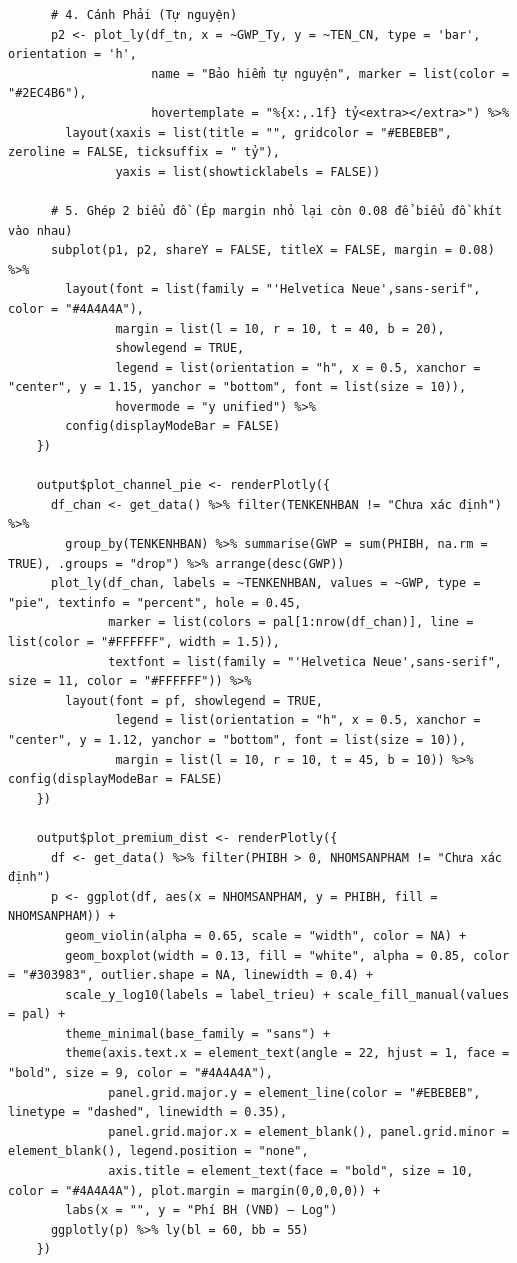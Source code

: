 \documentclass[12pt, a4paper]{article}
\begin{document}
\begin{lstlisting}
      # 4. Cánh Phải (Tự nguyện)
      p2 <- plot_ly(df_tn, x = ~GWP_Ty, y = ~TEN_CN, type = 'bar', orientation = 'h',
                    name = "Bảo hiểm tự nguyện", marker = list(color = "#2EC4B6"),
                    hovertemplate = "%{x:,.1f} tỷ<extra></extra>") %>%
        layout(xaxis = list(title = "", gridcolor = "#EBEBEB", zeroline = FALSE, ticksuffix = " tỷ"),
               yaxis = list(showticklabels = FALSE)) 
      
      # 5. Ghép 2 biểu đồ (Ép margin nhỏ lại còn 0.08 để biểu đồ khít vào nhau)
      subplot(p1, p2, shareY = FALSE, titleX = FALSE, margin = 0.08) %>%
        layout(font = list(family = "'Helvetica Neue',sans-serif", color = "#4A4A4A"),
               margin = list(l = 10, r = 10, t = 40, b = 20),
               showlegend = TRUE,
               legend = list(orientation = "h", x = 0.5, xanchor = "center", y = 1.15, yanchor = "bottom", font = list(size = 10)),
               hovermode = "y unified") %>% 
        config(displayModeBar = FALSE)
    })

    output$plot_channel_pie <- renderPlotly({
      df_chan <- get_data() %>% filter(TENKENHBAN != "Chưa xác định") %>%
        group_by(TENKENHBAN) %>% summarise(GWP = sum(PHIBH, na.rm = TRUE), .groups = "drop") %>% arrange(desc(GWP))
      plot_ly(df_chan, labels = ~TENKENHBAN, values = ~GWP, type = "pie", textinfo = "percent", hole = 0.45,
              marker = list(colors = pal[1:nrow(df_chan)], line = list(color = "#FFFFFF", width = 1.5)),
              textfont = list(family = "'Helvetica Neue',sans-serif", size = 11, color = "#FFFFFF")) %>%
        layout(font = pf, showlegend = TRUE,
               legend = list(orientation = "h", x = 0.5, xanchor = "center", y = 1.12, yanchor = "bottom", font = list(size = 10)),
               margin = list(l = 10, r = 10, t = 45, b = 10)) %>% config(displayModeBar = FALSE)
    })

    output$plot_premium_dist <- renderPlotly({
      df <- get_data() %>% filter(PHIBH > 0, NHOMSANPHAM != "Chưa xác định")
      p <- ggplot(df, aes(x = NHOMSANPHAM, y = PHIBH, fill = NHOMSANPHAM)) +
        geom_violin(alpha = 0.65, scale = "width", color = NA) +
        geom_boxplot(width = 0.13, fill = "white", alpha = 0.85, color = "#303983", outlier.shape = NA, linewidth = 0.4) +
        scale_y_log10(labels = label_trieu) + scale_fill_manual(values = pal) +
        theme_minimal(base_family = "sans") +
        theme(axis.text.x = element_text(angle = 22, hjust = 1, face = "bold", size = 9, color = "#4A4A4A"),
              panel.grid.major.y = element_line(color = "#EBEBEB", linetype = "dashed", linewidth = 0.35),
              panel.grid.major.x = element_blank(), panel.grid.minor = element_blank(), legend.position = "none",
              axis.title = element_text(face = "bold", size = 10, color = "#4A4A4A"), plot.margin = margin(0,0,0,0)) +
        labs(x = "", y = "Phí BH (VNĐ) — Log")
      ggplotly(p) %>% ly(bl = 60, bb = 55)
    })


\end{lstlisting}
\end{document}
